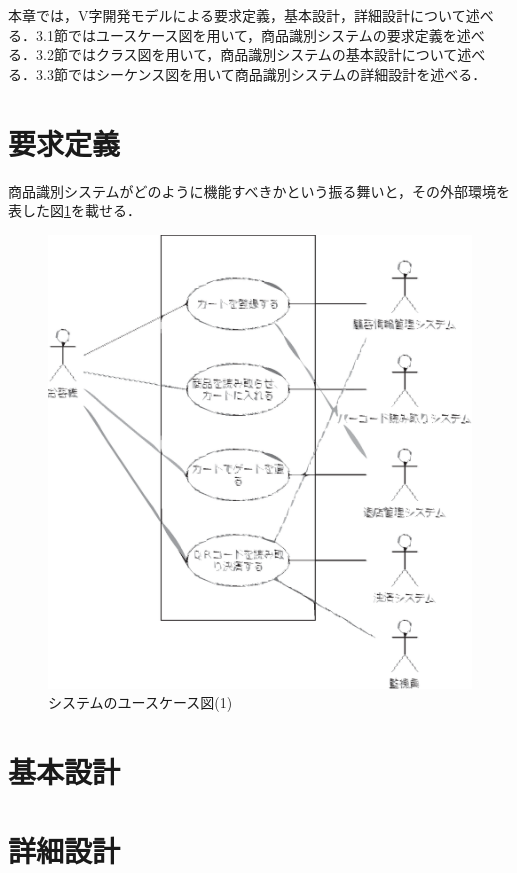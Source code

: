 


本章では，V字開発モデルによる要求定義，基本設計，詳細設計について述べる．3.1節ではユースケース図を用いて，商品識別システムの要求定義を述べる．3.2節ではクラス図を用いて，商品識別システムの基本設計について述べる．3.3節ではシーケンス図を用いて商品識別システムの詳細設計を述べる．


\section{要求定義}


商品識別システムがどのように機能すべきかという振る舞いと，その外部環境を表した図\ref{usecase1}を載せる．

\begin{figure}[htbp]
\centering
\includegraphics[width=15cm]{picture/usecase1.eps}
\caption{システムのユースケース図(1)}
\label{usecase1}
\end{figure}


\section{基本設計}

\section{詳細設計}
